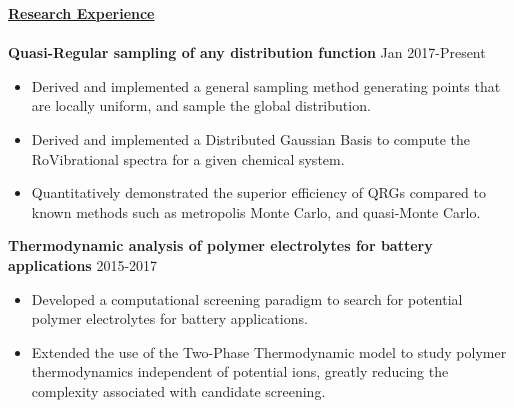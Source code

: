 \documentclass[letterpaper]{article}
\begin{document}
{\large \textbf{\underline{Research Experience}}}\\
\vspace{-0.06in}\\
\textbf{Quasi-Regular sampling of any distribution function} \hfill Jan 2017-Present
\begin{itemize}
    \item Derived and implemented a general sampling method generating points
    that are locally uniform, and sample the global distribution.
    \vspace{-0.05in}
    \item Derived and implemented a Distributed Gaussian Basis to compute
    the RoVibrational spectra for a given chemical system.
    \vspace{-0.05in}
    \item Quantitatively demonstrated the superior efficiency of QRGs compared
    to known methods such as metropolis Monte Carlo, and quasi-Monte Carlo.
\end{itemize}

\textbf{Thermodynamic analysis of polymer electrolytes for battery applications}
\hfill 2015-2017
\begin{itemize}
    \item Developed a computational screening paradigm to search for potential
    polymer electrolytes for battery applications.
    \vspace{-0.05in}
    \item Extended the use of the Two-Phase Thermodynamic model to study
    polymer thermodynamics independent of potential ions, greatly reducing the
    complexity associated with candidate screening.
\end{itemize}
\end{document}
